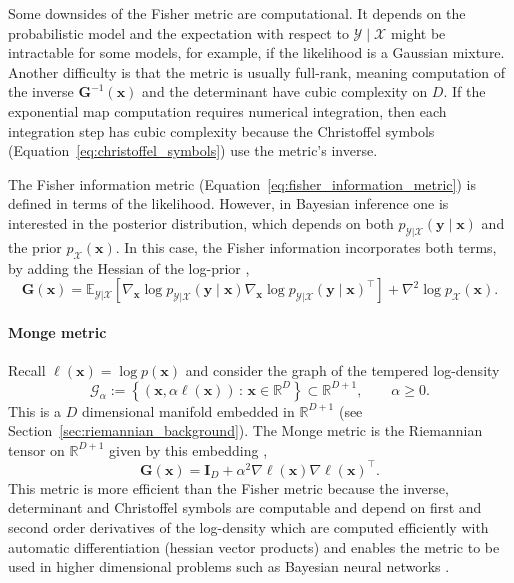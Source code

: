 Some downsides of the Fisher metric are computational. It depends on the probabilistic model and the expectation with respect to $\mathcal{Y}\mid\mathcal{X}$ might be intractable for some models, for example, if the likelihood is a Gaussian mixture. Another difficulty is that the metric is usually full-rank, meaning computation of the inverse $\mathbf{G}^{-1}(\boldsymbol{x})$ and the determinant have cubic complexity on $D$. If the exponential map computation requires numerical integration, then each integration step has cubic complexity because the Christoffel symbols (Equation~\ref{eq:christoffel_symbols}) use the metric's inverse.

The Fisher information metric (Equation~\ref{eq:fisher_information_metric}) is defined in terms of the likelihood. However, in Bayesian inference one is interested in the posterior distribution, which depends on both $p_{\mathcal{Y}|\mathcal{X}}(\boldsymbol{y}\mid\boldsymbol{x})$ and the prior $p_{\mathcal{X}}(\boldsymbol{x})$. In this case, the Fisher information incorporates both terms, by adding the Hessian of the log-prior \citep{Girolami2011},
\begin{equation}
 \mathbf{G}(\boldsymbol{x}) = \mathbb{E}_{\mathcal{Y}|\mathcal{X}}\left[ \nabla_{\boldsymbol{x}} \log p_{\mathcal{Y}|\mathcal{X}}(\boldsymbol{y}\mid\boldsymbol{x})
 \nabla_{\boldsymbol{x}} \log p_{\mathcal{Y}|\mathcal{X}}(\boldsymbol{y}\mid\boldsymbol{x}) ^\top
 \right]  + \nabla^2 \log p_{\mathcal{X}}(\boldsymbol{x}).
 \label{eq:fisher_w_prior}
\end{equation}


\paragraph{Monge metric}
Recall $\ell(\boldsymbol{x}) = \log p(\boldsymbol{x})$ and consider the graph of the tempered log-density
\begin{equation*}
\mathcal{G}_{\alpha}
:=
\left\{
(\boldsymbol{x}, \alpha \ell(\boldsymbol{x}))
\,:\,
\boldsymbol{x}\in \mathbb{R}^D
\right\}
\subset \mathbb{R}^{D+1},
\qquad \alpha \geq 0.    
\end{equation*}
This is a $D$ dimensional manifold embedded in $\mathbb{R}^{D+1}$ (see Section~\ref{sec:riemannian_background}). The Monge metric is the Riemannian tensor on $\mathbb{R}^{D+1}$ given by this embedding \citep{Hartmann2022},
\begin{equation*}
    \mathbf{G}(\boldsymbol{x}) = \mathbf{I}_D + \alpha^2 \nabla \ell(\boldsymbol{x})\nabla \ell(\boldsymbol{x})^\top.
\end{equation*}
This metric is more efficient than the Fisher metric because the inverse, determinant and Christoffel symbols are computable and depend on first and second order derivatives of the log-density which are computed efficiently with automatic differentiation (hessian vector products) and enables the metric to be used in higher dimensional problems such as Bayesian neural networks \citep{Bergamin2024, yu2023scalable}.

